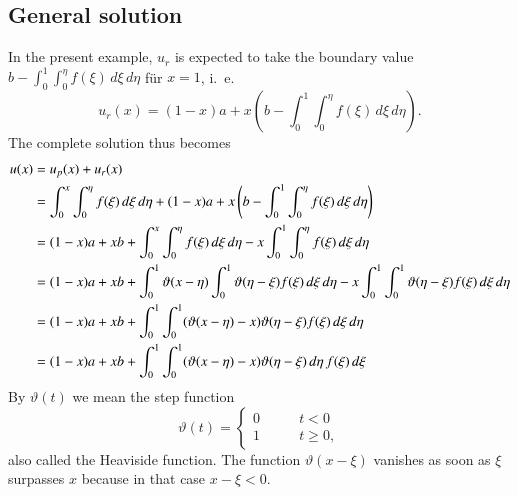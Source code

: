 \subsection{General solution}
In the present example, $u_r$ is expected to take the boundary value
$b-\int_0^1\int_0^\eta f(\xi)\,d\xi\,d\eta$
für $x=1$, i.~e.
\[
u_r(x)=(1-x)a+x\left(b-\int_0^1\int_0^\eta f(\xi)\,d\xi\,d\eta\right).
\]
The complete solution thus becomes
\begin{align}
u(x)&=u_p(x)+u_r(x)\notag
\\
&=\int_0^x\int_0^\eta f(\xi)\,d\xi\,d\eta+(1-x)a+x\left(b-\int_0^1\int_0^\eta f(\xi)\,d\xi\,d\eta\right)\notag
\\
&=
(1-x)a+xb
+\int_0^x\int_0^\eta f(\xi)\,d\xi\,d\eta
-x\int_0^1\int_0^\eta f(\xi)\,d\xi\,d\eta\notag
\\
&=
(1-x)a+xb
+\int_0^1\vartheta(x-\eta)\int_0^1 \vartheta(\eta - \xi)f(\xi)\,d\xi\,d\eta
-x\int_0^1\int_0^1\vartheta(\eta-\xi) f(\xi)\,d\xi\,d\eta\notag
\\
&=
(1-x)a+xb
+\int_0^1\int_0^1
(\vartheta(x-\eta)-x)\vartheta(\eta -\xi)
f(\xi)\,d\xi\,d\eta
\notag
\\
&=
(1-x)a+xb+\int_0^1\int_0^1
(\vartheta(x-\eta)-x)\vartheta(\eta -\xi)
\,d\eta\,
f(\xi)\,d\xi
\label{1dimgreen}
\end{align}
By $\vartheta(t)$ we mean the step function
\[
\vartheta(t)=\begin{cases}
0&\qquad t<0\\
1&\qquad t\ge 0,
\end{cases}
\]
also called the Heaviside function.
The function $\vartheta(x-\xi)$ vanishes as soon as $\xi$ surpasses
$x$ because in that case $x-\xi<0$.

